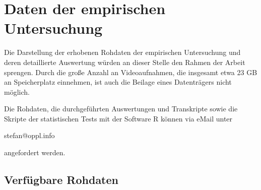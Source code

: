 \chapter{Daten der empirischen Untersuchung} %
\label{cha:daten_der_empirischen_untersuchung}

Die Darstellung der erhobenen Rohdaten der empirischen Untersuchung und deren detaillierte Auswertung würden an dieser Stelle den Rahmen der Arbeit sprengen. Durch die große Anzahl an Videoaufnahmen, die insgesamt etwa 23 \gls{GB} an Speicherplatz einnehmen, ist auch die Beilage eines Datenträgers nicht möglich. 

Die Rohdaten, die durchgeführten Auswertungen und Transkripte sowie die Skripte der statistischen Tests mit der Software R können via eMail unter

\begin{center} stefan@oppl.info \end{center}

angefordert werden. 

\section{Verfügbare Rohdaten} %
\label{sec:verfügbare_rohdaten}

